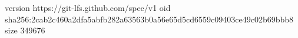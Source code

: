 version https://git-lfs.github.com/spec/v1
oid sha256:2cab2c460a2dfa5abfb282a63563b0a56e65d5cd6559c09403ce49c02b69bbb8
size 349676
